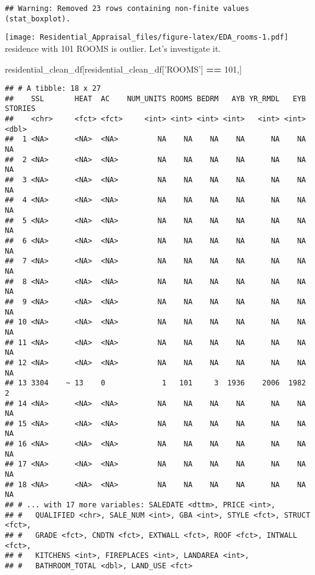 \documentclass[]{article}
\newenvironment{Shaded}{\begin{snugshade}}{\end{snugshade}}
\newcommand{\DecValTok}[1]{\textcolor[rgb]{0.00,0.00,0.81}{#1}}
\newcommand{\NormalTok}[1]{#1}
\newcommand{\OperatorTok}[1]{\textcolor[rgb]{0.81,0.36,0.00}{\textbf{#1}}}
\newcommand{\StringTok}[1]{\textcolor[rgb]{0.31,0.60,0.02}{#1}}
\begin{document}
\begin{verbatim}
## Warning: Removed 23 rows containing non-finite values (stat_boxplot).
\end{verbatim}

\texttt{[image: Residential\_Appraisal\_files/figure-latex/EDA\_rooms-1.pdf]}
residence with 101 ROOMS is outlier. Let's investigate it.

\begin{Shaded}
\begin{Highlighting}[]
\NormalTok{residential_clean_df[residential_clean_df[}\StringTok{'ROOMS'}\NormalTok{] }\OperatorTok{==}\StringTok{ }\DecValTok{101}\NormalTok{,]}
\end{Highlighting}
\end{Shaded}

\begin{verbatim}
## # A tibble: 18 x 27
##    SSL       HEAT  AC    NUM_UNITS ROOMS BEDRM   AYB YR_RMDL   EYB STORIES
##    <chr>     <fct> <fct>     <int> <int> <int> <int>   <int> <int>   <dbl>
##  1 <NA>      <NA>  <NA>         NA    NA    NA    NA      NA    NA      NA
##  2 <NA>      <NA>  <NA>         NA    NA    NA    NA      NA    NA      NA
##  3 <NA>      <NA>  <NA>         NA    NA    NA    NA      NA    NA      NA
##  4 <NA>      <NA>  <NA>         NA    NA    NA    NA      NA    NA      NA
##  5 <NA>      <NA>  <NA>         NA    NA    NA    NA      NA    NA      NA
##  6 <NA>      <NA>  <NA>         NA    NA    NA    NA      NA    NA      NA
##  7 <NA>      <NA>  <NA>         NA    NA    NA    NA      NA    NA      NA
##  8 <NA>      <NA>  <NA>         NA    NA    NA    NA      NA    NA      NA
##  9 <NA>      <NA>  <NA>         NA    NA    NA    NA      NA    NA      NA
## 10 <NA>      <NA>  <NA>         NA    NA    NA    NA      NA    NA      NA
## 11 <NA>      <NA>  <NA>         NA    NA    NA    NA      NA    NA      NA
## 12 <NA>      <NA>  <NA>         NA    NA    NA    NA      NA    NA      NA
## 13 3304    ~ 13    0             1   101     3  1936    2006  1982       2
## 14 <NA>      <NA>  <NA>         NA    NA    NA    NA      NA    NA      NA
## 15 <NA>      <NA>  <NA>         NA    NA    NA    NA      NA    NA      NA
## 16 <NA>      <NA>  <NA>         NA    NA    NA    NA      NA    NA      NA
## 17 <NA>      <NA>  <NA>         NA    NA    NA    NA      NA    NA      NA
## 18 <NA>      <NA>  <NA>         NA    NA    NA    NA      NA    NA      NA
## # ... with 17 more variables: SALEDATE <dttm>, PRICE <int>,
## #   QUALIFIED <chr>, SALE_NUM <int>, GBA <int>, STYLE <fct>, STRUCT <fct>,
## #   GRADE <fct>, CNDTN <fct>, EXTWALL <fct>, ROOF <fct>, INTWALL <fct>,
## #   KITCHENS <int>, FIREPLACES <int>, LANDAREA <int>,
## #   BATHROOM_TOTAL <dbl>, LAND_USE <fct>
\end{verbatim}
\end{document}
